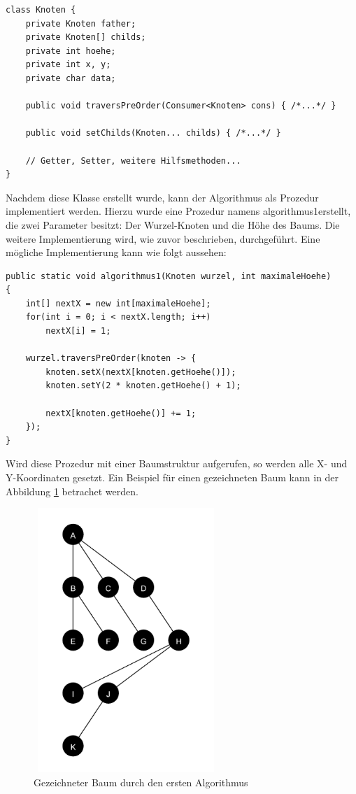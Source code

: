 \begin{lstlisting}[caption=Vereinfachte Implementierung der Knotenklasse, label=code:knotenclass]
class Knoten {
	private Knoten father;
	private Knoten[] childs;
	private int hoehe;
	private int x, y;
	private char data;

	public void traversPreOrder(Consumer<Knoten> cons) { /*...*/ }

	public void setChilds(Knoten... childs) { /*...*/ }

	// Getter, Setter, weitere Hilfsmethoden...
}
\end{lstlisting}
Nachdem diese Klasse erstellt wurde, kann der Algorithmus als Prozedur implementiert werden.
Hierzu wurde eine Prozedur namens \glqq algorithmus1\grqq erstellt, die zwei Parameter besitzt: Der Wurzel-Knoten
und die Höhe des Baums. Die weitere Implementierung wird, wie zuvor beschrieben, durchgeführt. Eine mögliche Implementierung
kann wie folgt aussehen:

\begin{lstlisting}[caption=Implementierung des naiven Algorithmus]
public static void algorithmus1(Knoten wurzel, int maximaleHoehe) 
{
	int[] nextX = new int[maximaleHoehe];
	for(int i = 0; i < nextX.length; i++)
		nextX[i] = 1;
	
	wurzel.traversPreOrder(knoten -> {
		knoten.setX(nextX[knoten.getHoehe()]);
		knoten.setY(2 * knoten.getHoehe() + 1);
		
		nextX[knoten.getHoehe()] += 1;
	});
}
\end{lstlisting}

Wird diese Prozedur mit einer Baumstruktur aufgerufen, so werden alle X- und Y-Koordinaten gesetzt.
Ein Beispiel für einen gezeichneten Baum kann in der Abbildung \ref{pic:baum_algo_1} betrachet werden.

\begin{figure}[H]
    \centering
    \includegraphics[width=7cm, height=10cm]{abbildungen/baum_algo_1}
    \caption{Gezeichneter Baum durch den ersten Algorithmus}
    \label{pic:baum_algo_1} 
\end{figure}

